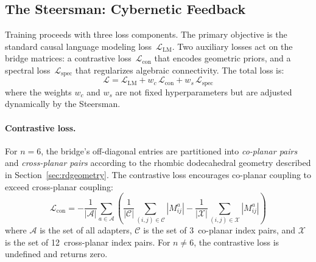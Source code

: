 \documentclass[11pt]{article}
\begin{document}
\subsection{The Steersman: Cybernetic Feedback}
\label{sec:steersman}

Training proceeds with three loss components. The primary objective is
the standard causal language modeling loss~$\mathcal{L}_{\text{LM}}$.
Two auxiliary losses act on the bridge matrices: a contrastive
loss~$\mathcal{L}_{\text{con}}$ that encodes geometric priors, and a
spectral loss~$\mathcal{L}_{\text{spec}}$ that regularizes algebraic
connectivity. The total loss is:
%
\begin{equation}
  \mathcal{L} = \mathcal{L}_{\text{LM}} +
    w_c\, \mathcal{L}_{\text{con}} +
    w_s\, \mathcal{L}_{\text{spec}}
\end{equation}
%
where the weights $w_c$ and $w_s$ are not fixed hyperparameters but
are adjusted dynamically by the Steersman.

\paragraph{Contrastive loss.}
For $n = 6$, the bridge's off-diagonal entries are partitioned into
\emph{co-planar pairs} and \emph{cross-planar pairs} according to the
rhombic dodecahedral geometry described in
Section~\ref{sec:rdgeometry}. The contrastive loss encourages
co-planar coupling to exceed cross-planar coupling:
%
\begin{equation}
  \mathcal{L}_{\text{con}} = -\frac{1}{|\mathcal{A}|}
    \sum_{a \in \mathcal{A}} \left(
      \frac{1}{|\mathcal{C}|}\sum_{(i,j) \in \mathcal{C}} |M^a_{ij}|
      - \frac{1}{|\mathcal{X}|}\sum_{(i,j) \in \mathcal{X}} |M^a_{ij}|
    \right)
\end{equation}
%
where $\mathcal{A}$ is the set of all adapters, $\mathcal{C}$ is the
set of 3~co-planar index pairs, and $\mathcal{X}$ is the set of
12~cross-planar index pairs. For $n \neq 6$, the contrastive loss is
undefined and returns zero.
\end{document}
